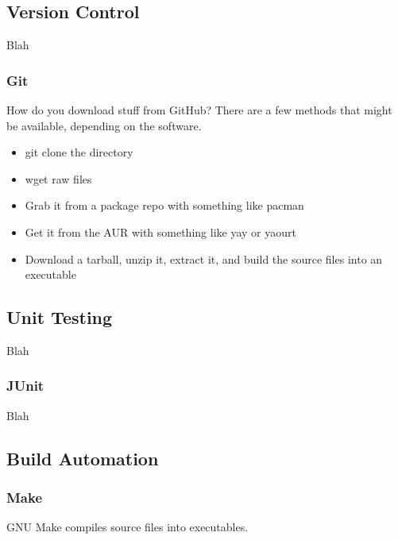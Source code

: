 
\subsection{Version Control}

Blah

\subsubsection{Git}

How do you download stuff from GitHub? There are a few methods that might be available, depending on the software.
\begin{itemize}
	\item git clone the directory
	\item wget raw files
	\item Grab it from a package repo with something like pacman
	\item Get it from the AUR with something like yay or yaourt
	\item Download a tarball, unzip it, extract it, and build the source files into an executable
\end{itemize}


\subsection{Unit Testing}

Blah

\subsubsection{JUnit}

Blah

\subsection{Build Automation}

\subsubsection{Make}

GNU Make compiles source files into executables.


